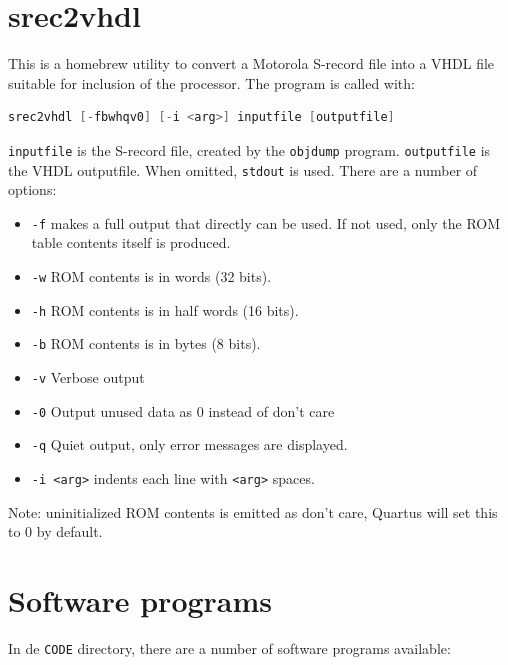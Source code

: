 \documentclass[12pt]{article}
\begin{document}
\section{srec2vhdl}
This is a homebrew utility to convert a Motorola S-record file into a VHDL file suitable for inclusion of the processor. The program is called with:

\begin{lstlisting}[language=c]
srec2vhdl [-fbwhqv0] [-i <arg>] inputfile [outputfile]
\end{lstlisting}

\texttt{inputfile} is the S-record file, created by the \texttt{objdump} program. \texttt{outputfile} is the VHDL outputfile. When omitted, \texttt{stdout} is used. There are a number of options:

\begin{itemize}
\item \texttt{-f} makes a full output that directly can be used. If not used, only the ROM table contents itself is produced.
\item \texttt{-w} ROM contents is in words (32 bits).
\item \texttt{-h} ROM contents is in half words (16 bits).
\item \texttt{-b} ROM contents is in bytes (8 bits).
\item \texttt{-v} Verbose output
\item \texttt{-0} Output unused data as 0 instead of don't care
\item \texttt{-q} Quiet output, only error messages are displayed.
\item \texttt{-i <arg>} indents each line with \texttt{<arg>} spaces.
\end{itemize}

Note: uninitialized ROM contents is emitted as don't care, Quartus will set this to 0 by default.

\section{Software programs}
In de \texttt{CODE} directory, there are a number of software programs available:
\end{document}
